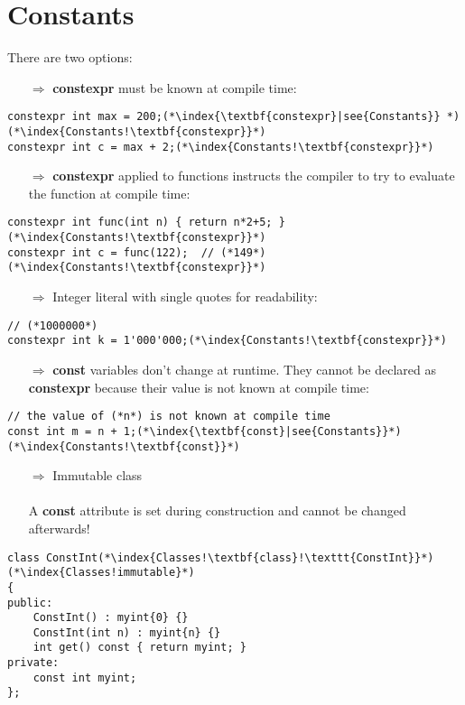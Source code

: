 \documentclass[10pt]{book}
\begin{document}
\section{Constants}
There are two options:
\begin{enumerate}
\item[$\Rightarrow$] \textbf{constexpr} must be known at compile time:
\end{enumerate}
\begin{lstlisting}
constexpr int max = 200;(*\index{\textbf{constexpr}|see{Constants}} *)(*\index{Constants!\textbf{constexpr}}*)
constexpr int c = max + 2;(*\index{Constants!\textbf{constexpr}}*)
\end{lstlisting}
\begin{enumerate}
\item[$\Rightarrow$] \textbf{constexpr} applied to functions instructs the compiler to try to evaluate the function at compile time:
\end{enumerate}
\begin{lstlisting}
constexpr int func(int n) { return n*2+5; }(*\index{Constants!\textbf{constexpr}}*)
constexpr int c = func(122);  // (*149*)(*\index{Constants!\textbf{constexpr}}*)
\end{lstlisting}
\begin{enumerate}
\item[$\Rightarrow$] Integer literal with single quotes for readability:
\end{enumerate}
\begin{lstlisting}
// (*1000000*)
constexpr int k = 1'000'000;(*\index{Constants!\textbf{constexpr}}*)
\end{lstlisting}
\begin{enumerate}
\item[$\Rightarrow$] \textbf{const} variables don't change at runtime. They cannot be declared as
\textbf{constexpr} because their value is not known at compile time:
\end{enumerate}
\begin{lstlisting}
// the value of (*n*) is not known at compile time
const int m = n + 1;(*\index{\textbf{const}|see{Constants}}*)(*\index{Constants!\textbf{const}}*)
\end{lstlisting}
\begin{enumerate}
\item[$\Rightarrow$] Immutable class\\ \\ A \textbf{const} attribute is set during construction and cannot be changed afterwards!
\end{enumerate}
\begin{lstlisting}
class ConstInt(*\index{Classes!\textbf{class}!\texttt{ConstInt}}*)(*\index{Classes!immutable}*)
{
public:
    ConstInt() : myint{0} {}
    ConstInt(int n) : myint{n} {}
    int get() const { return myint; }
private:
    const int myint;
};
\end{lstlisting}
%
%
\end{document}
